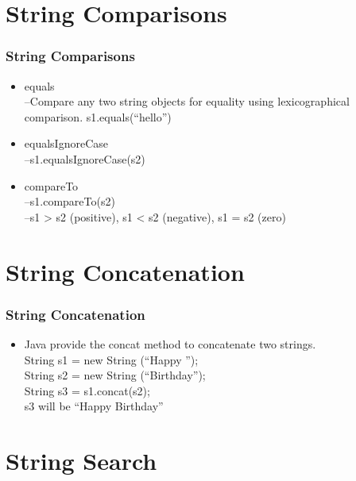 \documentclass{beamer}
\begin{document}

\section{String Comparisons}

\begin{frame}
\frametitle{String Comparisons}
\begin{itemize}
\item equals\\
–Compare any two string objects for equality using
lexicographical comparison. s1.equals(“hello”)
\item equalsIgnoreCase\\
–s1.equalsIgnoreCase(s2)
\item compareTo\\
–s1.compareTo(s2)\\
–s1 > s2 (positive), s1 < s2 (negative), s1 = s2 (zero)
\end{itemize}
\end{frame}



\section{String Concatenation}

\begin{frame}
\frametitle{String Concatenation}
\begin{itemize}
\item Java provide the concat method to concatenate two
strings.\\
String s1 = new String (“Happy ”);\\
String s2 = new String (“Birthday”);\\
String s3 = s1.concat(s2);\\
s3 will be “Happy Birthday”\\
\end{itemize}


\end{frame}


\section{String Search}
\end{document}
